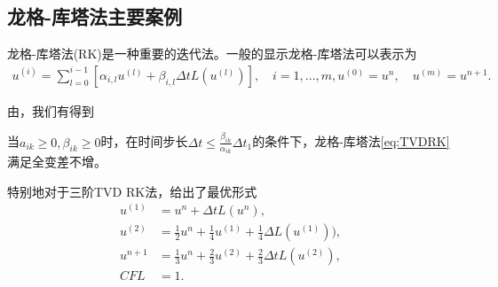 \subsection{龙格-库塔法主要案例}
龙格-库塔法(RK)是一种重要的迭代法。一般的显示龙格-库塔法可以表示为
\begin{equation}
    \begin{aligned}
        u^{(i)} = \sum_{l=0}^{i-1}[\alpha_{i,l}u^{(l)} + \beta_{i,l}\Delta tL(u^{(l)})], \quad i = 1,...,m,
        u^{(0)}=u^n,\quad u^{(m)} = u^{n+1}.
    \end{aligned}
    \label{eq:TVDRK}
\end{equation}

由\parencite{shu1998total}，我们有得到
\begin{lemma}
    当$a_{ik} \geq 0, \beta_{ik} \geq 0$时，在时间步长$\Delta t \leq \frac{\beta_{ik}}{\alpha_{ik}} \Delta t_1$的条件下，龙格-库塔法\eqref{eq:TVDRK}满足全变差不增。
\end{lemma}

特别地对于三阶TVD RK法，\parencite{shu1998total}给出了最优形式
\begin{equation}
    \begin{aligned}
        u^{(1)} & = u^n + \Delta t L(u^n),                                                \\
        u^{(2)} & = \frac{1}{2}u^n + \frac{1}{4}u^{(1)} + \frac{1}{4}\Delta L(u^{(1)})),  \\
        u^{n+1} & = \frac{1}{3}u^n + \frac{2}{3}u^{(2)} + \frac{2}{3}\Delta t L(u^{(2)}), \\
        CFL     & = 1.
    \end{aligned}
\end{equation}

